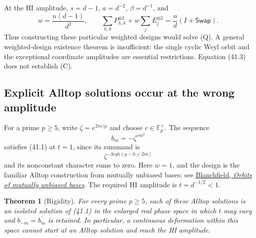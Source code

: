 \documentclass[11pt,reqno]{amsart}
\theoremstyle{plain}
\newtheorem{theorem}{Theorem}[section]
\begin{document}
At the HI amplitude, \(s=d-1\), \(a=d^{-2}\),
\(\beta=d^{-1}\), and
\begin{equation*}
 \boxed{w=\frac{n(d-1)}{d^2},\qquad
 \sum_{h,k}P_{h,k}^{\otimes2}+w\sum_jE_j^{\otimes2}
       =\frac nd(I+\mathsf{Swap}).} \tag{41.3}
\end{equation*}
Thus constructing these particular weighted designs would solve (Q).
A general weighted-design existence theorem is insufficient: the
single cyclic Weyl orbit and the exceptional coordinate amplitudes
are essential restrictions. Equation (41.3) does not establish (C).

\subsection{Explicit Alltop solutions occur at the wrong amplitude}\label{sec:41.2}

For a prime \(p\ge5\), write \(\zeta=e^{2\pi i/p}\) and choose
\(c\in\mathbb F_p^\times\). The sequence
\[
 b_m=-\zeta^{c m^3}
\]
satisfies (41.1) at \(t=1\), since its summand is
\[
 \zeta^{-3cgh(g-h+2m)}
\]
and its nonconstant character sums to zero. Here \(w=1\), and
the design is the familiar Alltop construction from mutually unbiased
bases; see \href{https://arxiv.org/abs/1310.4684}{Blanchfield, \emph{Orbits of mutually unbiased bases}}.
The required HI amplitude is \(t=d^{-1/2}<1\).

\begin{theorem}[Rigidity]
For every prime \(p\ge5\), each of these
Alltop solutions is an isolated solution of (41.1) in the enlarged
real phase space in which \(t\) may vary and
\(b_{-m}=\overline{b_m}\) is retained. In particular, a continuous
deformation within this space cannot start at an Alltop solution and
reach the HI amplitude.
\end{theorem}
\end{document}
